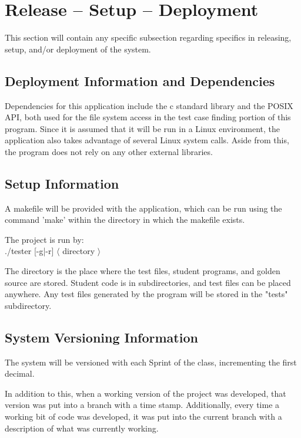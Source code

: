 
\chapter{Release -- Setup -- Deployment}
This section will contain any specific subsection regarding specifics in releasing, 
setup, and/or deployment of the system. 


\section{Deployment Information and Dependencies}
Dependencies for this application include the c standard library and the POSIX API, both used for the
file system access in the test case finding portion of this program. Since it is assumed that it will be run
in a Linux environment, the application also takes advantage of several Linux system calls. Aside from this,
the program does not rely on any other external libraries.



\section{Setup Information}
A makefile will be provided with the application, which can be run using the command 'make' within the 
directory in which the makefile exists.

The project is run by: \\
./tester [-g|-r] $\langle$ directory $\rangle$

The directory is the place where the test files, student programs, and golden source are stored. Student code is in subdirectories, and test files can be placed anywhere. Any test files generated by the program will be stored in the "tests" subdirectory.


\section{System  Versioning Information}
The system will be versioned with each Sprint of the class, incrementing the first decimal.

In addition to this, when a working version of the project was developed, that version was put into a branch with a time stamp. 
Additionally, every time a working bit of code was developed, it was put into the current branch with 
a description of what was currently working.
